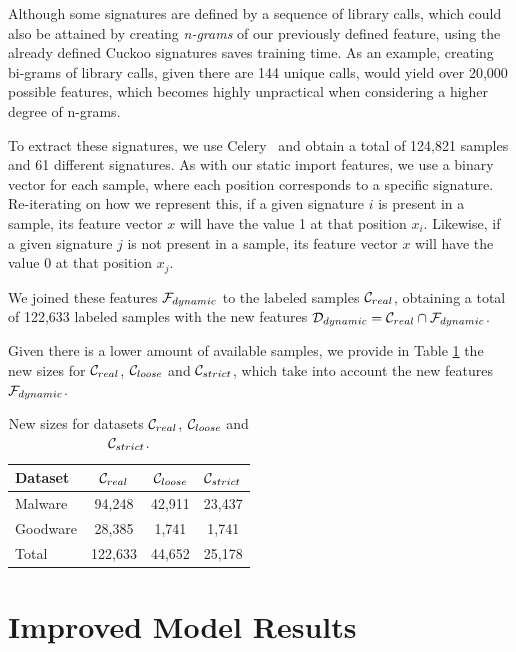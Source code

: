 Although some signatures are defined by a sequence of library calls, which could also be attained by creating \textit{n-grams} of our previously defined feature, using the already defined Cuckoo signatures saves training time.
As an example, creating bi-grams of library calls, given there are 144 unique calls, would yield over 20,000 possible features, which becomes highly unpractical when considering a higher degree of n-grams.

To extract these signatures, we use Celery~\cite{tool:celery} and obtain a total of 124,821 samples and 61 different signatures.
As with our static import features, we use a binary vector for each sample, where each position corresponds to a specific signature. Re-iterating on how we represent this, if a given signature $i$ is present in a sample, its feature vector $x$ will have the value 1 at that position $x_i$. Likewise, if a given signature $j$ is not present in a sample, its feature vector $x$ will have the value 0 at that position $x_j$.

\medskip

We joined these features $\mathcal{F}_{dynamic}$ to the labeled samples $\mathcal{C}_{real}$, obtaining a total of 122,633 labeled samples with the new features $\mathcal{D}_{dynamic} = \mathcal{C}_{real} \cap \mathcal{F}_{dynamic}$.

Given there is a lower amount of available samples, we provide in Table \ref{tab:dataset_sizes_improved} the new sizes for $\mathcal{C}_{real}$, $\mathcal{C}_{loose}$ and $\mathcal{C}_{strict}$, which take into account the new features $\mathcal{F}_{dynamic}$.

\begin{table}[!htb]
	\renewcommand{\arraystretch}{1.2} %
	\centering
	\begin{tabular}{lccc}
		\toprule
		Dataset			& $\mathcal{C}_{real}$ & $\mathcal{C}_{loose}$ & $\mathcal{C}_{strict}$	\\
		\midrule
		Malware			& 94,248 & 42,911 & 23,437\\
		Goodware		& 28,385 & 1,741 & 1,741\\
		\midrule
		Total			& 122,633 & 44,652 & 25,178\\
		\bottomrule
	\end{tabular}
	\caption{New sizes for datasets $\mathcal{C}_{real}$, $\mathcal{C}_{loose}$ and $\mathcal{C}_{strict}$.}
	\label{tab:dataset_sizes_improved}
\end{table}

\section{Improved Model Results}
\label{section:improvements_results}

